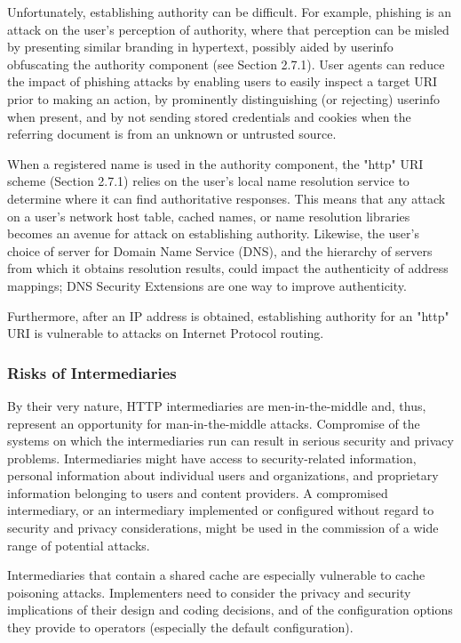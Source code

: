 Unfortunately, establishing authority can be difficult.  For example,
phishing is an attack on the user's perception of authority, where
that perception can be misled by presenting similar branding in
hypertext, possibly aided by userinfo obfuscating the authority
component (see Section 2.7.1).  User agents can reduce the impact of
phishing attacks by enabling users to easily inspect a target URI
prior to making an action, by prominently distinguishing (or
rejecting) userinfo when present, and by not sending stored
credentials and cookies when the referring document is from an
unknown or untrusted source.

When a registered name is used in the authority component, the "http"
URI scheme (Section 2.7.1) relies on the user's local name resolution
service to determine where it can find authoritative responses.  This
means that any attack on a user's network host table, cached names,
or name resolution libraries becomes an avenue for attack on
establishing authority.  Likewise, the user's choice of server for
Domain Name Service (DNS), and the hierarchy of servers from which it
obtains resolution results, could impact the authenticity of address
mappings; DNS Security Extensions are one way to
improve authenticity.

Furthermore, after an IP address is obtained, establishing authority
for an "http" URI is vulnerable to attacks on Internet Protocol
routing.


\subsubsection{Risks of Intermediaries}

By their very nature, HTTP intermediaries are men-in-the-middle and,
thus, represent an opportunity for man-in-the-middle attacks.
Compromise of the systems on which the intermediaries run can result
in serious security and privacy problems.  Intermediaries might have
access to security-related information, personal information about
individual users and organizations, and proprietary information
belonging to users and content providers.  A compromised
intermediary, or an intermediary implemented or configured without
regard to security and privacy considerations, might be used in the
commission of a wide range of potential attacks.

Intermediaries that contain a shared cache are especially vulnerable
to cache poisoning attacks.
Implementers need to consider the privacy and security implications
of their design and coding decisions, and of the configuration
options they provide to operators (especially the default
configuration).

